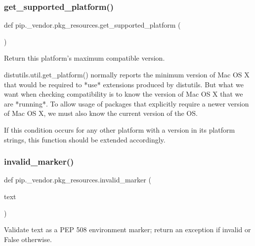 \subsubsection{\texorpdfstring{get\+\_\+supported\+\_\+platform()}{get\_supported\_platform()}}
{\footnotesize\ttfamily def pip.\+\_\+vendor.\+pkg\+\_\+resources.\+get\+\_\+supported\+\_\+platform (\begin{DoxyParamCaption}{ }\end{DoxyParamCaption})}

\begin{DoxyVerb}Return this platform's maximum compatible version.

distutils.util.get_platform() normally reports the minimum version
of Mac OS X that would be required to *use* extensions produced by
distutils.  But what we want when checking compatibility is to know the
version of Mac OS X that we are *running*.  To allow usage of packages that
explicitly require a newer version of Mac OS X, we must also know the
current version of the OS.

If this condition occurs for any other platform with a version in its
platform strings, this function should be extended accordingly.
\end{DoxyVerb}
 \mbox{\label{namespacepip_1_1__vendor_1_1pkg__resources_af839e556aca0d802756e520c15420a81}} 
\subsubsection{\texorpdfstring{invalid\+\_\+marker()}{invalid\_marker()}}
{\footnotesize\ttfamily def pip.\+\_\+vendor.\+pkg\+\_\+resources.\+invalid\+\_\+marker (\begin{DoxyParamCaption}\item[{}]{text }\end{DoxyParamCaption})}

\begin{DoxyVerb}Validate text as a PEP 508 environment marker; return an exception
if invalid or False otherwise.
\end{DoxyVerb}
 \mbox{\label{namespacepip_1_1__vendor_1_1pkg__resources_ad9f0c6a743f176a2909c699e9b5b3747}} 
